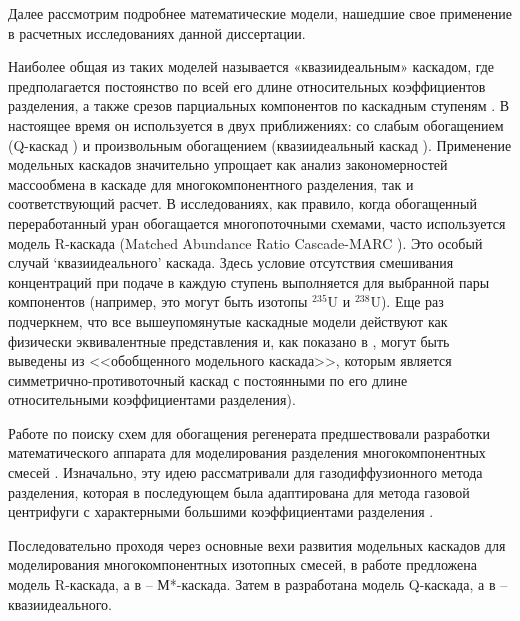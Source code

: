 Далее рассмотрим подробнее математические модели, нашедшие свое применение в расчетных исследованиях данной диссертации.

Наиболее общая из таких моделей называется «квазиидеальным» каскадом, где предполагается постоянство по всей его длине относительных коэффициентов разделения, а также срезов парциальных компонентов по каскадным ступеням \cite{yamamotoMulticomponentIsotopeSeparating1978}.
В настоящее время он используется в двух приближениях: со слабым обогащением (Q-каскад \cite{borisevichNewApproachOptimize2011, kolokoltsovDesignCascadesSeparating1970, zengQCascadeExplanation2012}) и произвольным обогащением (квазиидеальный каскад \cite{sulaberidzeSpecialFeaturesEnrichment2006}).
Применение модельных каскадов значительно упрощает как анализ закономерностей массообмена в каскаде для многокомпонентного разделения, так и соответствующий расчет.
В исследованиях, как правило, когда обогащенный переработанный уран обогащается многопоточными схемами, часто используется модель R-каскада (Matched Abundance Ratio Cascade-MARC \cite{kazukihidaSimultaneousEvaluationEffects1986, delagarzaMulticomponentIsotopeSeparation1961, woodEffectsSeparationProcesses2008}).
Это особый случай `квазиидеального' каскада. Здесь условие отсутствия смешивания концентраций при подаче в каждую ступень выполняется для выбранной пары компонентов (например, это могут быть изотопы $^{235}$U и $^{238}$U).
Еще раз подчеркнем, что все вышеупомянутые каскадные модели действуют как физически эквивалентные представления и, как показано в \cite{sulaberidzeClassificationModelCascades2020}, могут быть выведены из <<обобщенного модельного каскада>>, которым является симметрично-противоточный каскад с постоянными по его длине относительными коэффициентами разделения).

Работе по поиску схем для обогащения регенерата предшествовали разработки математического аппарата для моделирования разделения многокомпонентных смесей \cite{delagarzaMulticomponentIsotopeSeparation1961}.
Изначально, эту идею рассматривали для газодиффузионного метода разделения, которая в последующем была адаптирована для метода газовой центрифуги с характерными большими коэффициентами разделения \cite{yamamotoMulticomponentIsotopeSeparating1978}.

Последовательно проходя через основные вехи развития модельных каскадов для моделирования многокомпонентных изотопных смесей, в работе \cite{delagarzaMulticomponentIsotopeSeparation1961} предложена модель R-каскада, а в \cite{levin1963} -- М*-каскада.
Затем в \cite{kolokoltsovDesignCascadesSeparating1970} разработана модель Q-каскада, а в \cite{sazykinKvaziidealnyeKaskadyDlya2000} -- квазиидеального.

